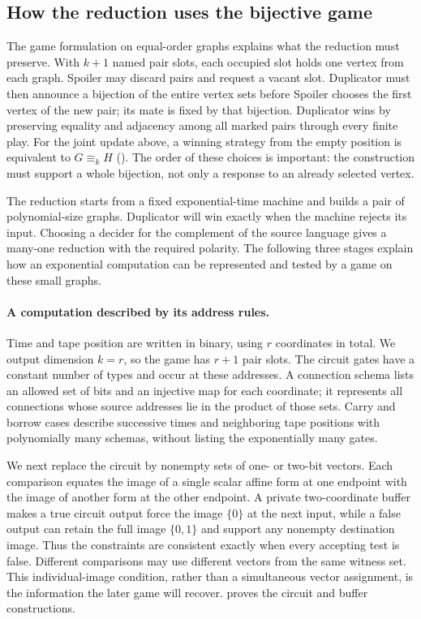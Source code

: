\subsection{How the reduction uses the bijective game}

The game formulation on equal-order graphs explains what the reduction
must preserve.
With \(k+1\) named pair slots, each occupied slot holds one vertex
from each graph. Spoiler may discard pairs and request a vacant slot.
Duplicator must then announce a bijection of the entire vertex sets
before Spoiler chooses the first vertex of the new pair; its mate is
fixed by that bijection. Duplicator wins by preserving equality and
adjacency among all marked pairs through every finite play.
For the joint update above, a winning strategy from the empty position
is equivalent to \(G\equiv_k H\)
(). The order of these choices is important: the
construction must support a whole bijection, not only a response to an
already selected vertex.

The reduction starts from a fixed exponential-time machine and builds
a pair of polynomial-size graphs. Duplicator will win exactly when the
machine rejects its input. Choosing a decider for the complement of the
source language gives a many-one reduction with the required polarity.
The following three stages explain how an exponential computation can
be represented and tested by a game on these small graphs.

\paragraph{A computation described by its address rules.}
Time and tape position are written in binary, using \(r\) coordinates
in total. We output dimension \(k=r\), so the game has \(r+1\) pair
slots. The circuit gates have a constant number of types and occur
at these addresses. A connection schema lists an allowed set of bits
and an injective map for each coordinate; it represents all connections
whose source addresses lie in the product of those sets.
Carry and borrow cases describe successive times and neighboring tape
positions with polynomially many schemas, without listing the
exponentially many gates.

We next replace the circuit by nonempty sets of one- or two-bit vectors.
Each comparison equates the image of a single scalar affine form at
one endpoint with the image of another form at the other endpoint.
A private two-coordinate buffer makes a true circuit output force the
image \(\{0\}\) at the next input, while a false output can retain the
full image \(\{0,1\}\) and support any nonempty destination image.
Thus the constraints are consistent exactly when every accepting test
is false. Different comparisons may use different vectors from the
same witness set. This individual-image condition, rather than a
simultaneous vector assignment, is the information the later game
will recover.  proves the circuit and buffer
constructions.

